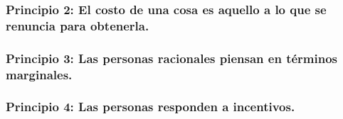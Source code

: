 \subsubsection{Principio 2: El costo de una cosa es aquello a lo que se renuncia para obtenerla.}
\subsubsection{Principio 3: Las personas racionales piensan en términos marginales.}
\subsubsection{Principio 4: Las personas responden a incentivos.}